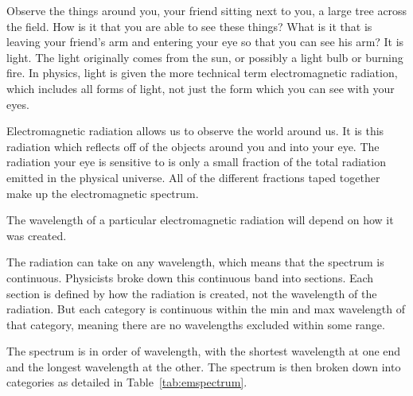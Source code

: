 Observe the things around you, your friend sitting next to you, a large tree across the field. How is it that you are able to see these things? What is it that is leaving your friend's arm and entering your eye so that you can see his arm? It is light. The light originally comes from the sun, or possibly a light bulb or burning fire. In physics, light is given the more technical term electromagnetic radiation, which includes all forms of light, not just the form which you can see with your eyes. 

Electromagnetic radiation allows us to observe the world around us. It is this radiation which reflects off of the objects around you and into your eye. The radiation your eye is sensitive to is only a small fraction of the total radiation emitted in the physical universe. All of the different fractions taped together make up the electromagnetic spectrum. 


The wavelength of a particular electromagnetic radiation will depend on how it was created. 


The radiation can take on any wavelength, which means that the spectrum is continuous. Physicists broke down this continuous band into sections. Each section is defined by how the radiation is created, not the wavelength of the radiation. But each category is continuous within the min and max wavelength of that category, meaning there are no wavelengths excluded within some range. 

The spectrum is in order of wavelength, with the shortest wavelength at one end and the longest wavelength at the other. The spectrum is then broken down into categories as detailed in Table~\ref{tab:emspectrum}.

